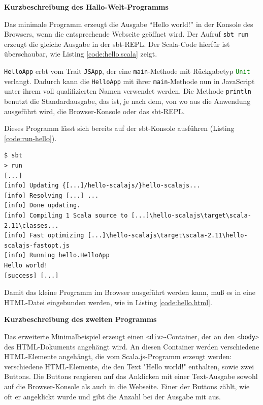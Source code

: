 \documentclass[a4paper, 12pt, hidelinks, listof=totoc, listoftables=totoc, bibliography=totoc]{scrreprt}
\newcommand{\code}[1]{\lstinline[language=Scala, style=inline]|#1|}
\newcommand{\scala}[1]{\lstinline[language=Scala, style=inline]|#1|}
\newcommand{\MyMiniSec}[1]{\rmfamily\fontsize{12}{15}\selectfont
	\vspace{7pt}\textbf{#1} %
}
\begin{document}
\MyMiniSec{Kurzbeschreibung des Hallo-Welt-Programms}

Das minimale Programm erzeugt die Ausgabe "`Hello world!"' in der Konsole des Browsers, wenn die entsprechende Webseite geöffnet wird. Der Aufruf \code{sbt run} erzeugt die gleiche Ausgabe in der sbt-\ac{REPL}. Der Scala-Code hierfür ist überschaubar, wie Listing \ref{code:hello.scala} zeigt.



\scala{HelloApp} erbt vom Trait \scala{JSApp}, der eine \scala{main}-Methode mit Rückgabetyp \scala{Unit} verlangt. Dadurch kann die \scala{HelloApp} mit ihrer \scala{main}-Methode nun in JavaScript unter ihrem voll qualifizierten Namen verwendet werden. Die Methode \scala{println} benutzt die Standardausgabe, das ist, je nach dem, von wo aus die Anwendung ausgeführt wird, die Browser-Konsole oder das sbt-\ac{REPL}.

Dieses Programm lässt sich bereits auf der sbt-Konsole ausführen (Listing \ref{code:run-hello}).

\begin{lstlisting}[caption={Lauf des Hallo-Welt-Programms in der sbt-REPL.}, label={code:run-hello}]
$ sbt
> run
[...]
[info] Updating {[...]/hello-scalajs/}hello-scalajs...
[info] Resolving [...] ...
[info] Done updating.
[info] Compiling 1 Scala source to [...]\hello-scalajs\target\scala-2.11\classes...
[info] Fast optimizing [...]\hello-scalajs\target\scala-2.11\hello-scalajs-fastopt.js
[info] Running hello.HelloApp
Hello world!
[success] [...]
\end{lstlisting}

Damit das kleine Programm im Browser ausgeführt werden kann, muß es in eine \ac{HTML}-Datei eingebunden werden, wie in Listing \ref{code:hello.html}.




\MyMiniSec{Kurzbeschreibung des zweiten Programms}

Das erweiterte Minimalbeispiel erzeugt einen \code{<div>}-Container, der an den \code{<body>} des \ac{HTML}-Dokuments angehängt wird. An diesen Container werden verschiedene \ac{HTML}-Elemente angehängt, die vom Scala.js-Programm erzeugt werden: verschiedene \ac{HTML}-Elemente, die den Text "Hello world!" enthalten, sowie zwei Buttons. Die Buttons reagieren auf das Anklicken mit einer Text-Ausgabe sowohl auf die Browser-Konsole als auch in die Webseite. Einer der Buttons zählt, wie oft er angeklickt wurde und gibt die Anzahl bei der Ausgabe mit aus.
\end{document}
